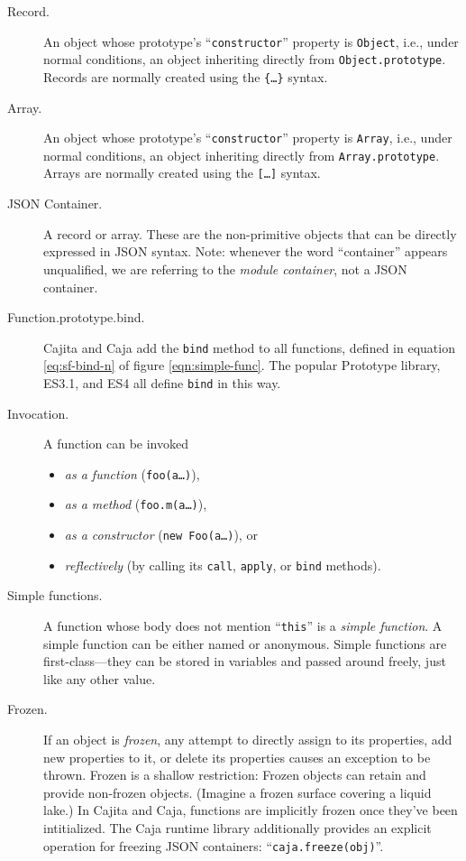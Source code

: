 \documentclass[letterpaper,twocolumn,10pt]{article}
\newcommand{\code}[1]{{\tt {#1}}}              %
\begin{document}
\begin{description}

  \item[Record.] An object whose prototype's ``\code{constructor}'' property is \code{Object}, i.e., under normal 
  conditions, an object inheriting directly from \code{Object.prototype}. Records are normally created using the 
  \code{\{\ldots\}} syntax.

  \item[Array.] An object whose prototype's ``\code{constructor}'' property is \code{Array}, i.e., under normal 
  conditions, an object inheriting directly from \code{Array.prototype}. Arrays are normally created using the 
  \code{[\ldots]} syntax.

  \item[JSON Container.] A record or array. These are the non-primitive objects that can be directly expressed in 
  JSON syntax.  Note: whenever the word ``container'' appears unqualified, we are referring to the \emph{module
  container}, not a JSON container.
  
  \item[Function.prototype.bind.] Cajita and Caja add the \code{bind} method to all functions, defined in equation
  \ref{eq:sf-bind-n} of figure \ref{eqn:simple-func}.  The popular Prototype library, ES3.1, and ES4 all define \code{bind}
  in this way.
  
  \item[Invocation.] A function can be invoked
  \begin{itemize}
    \item \emph{as a function} (\code{foo(a\ldots)}),
    \item \emph{as a method} (\code{foo.m(a\ldots)}),
    \item \emph{as a constructor} (\code{new Foo(a\ldots)}), or
    \item \emph{reflectively} (by calling its \code{call}, \code{apply}, or \code{bind} methods).
  \end{itemize}

  \item[Simple functions.] A function whose body does not mention ``\code{this}'' is a \emph{simple function}. A 
  simple function can be either named or anonymous. Simple functions are first-class---they can be stored in 
  variables and passed around freely, just like any other value.
  
  \item[Frozen.] If an object is \emph{frozen}, any attempt to directly assign to its properties, add new properties 
  to it, or delete its properties causes an exception to be thrown. Frozen is a shallow restriction: Frozen objects 
  can retain and provide non-frozen objects. (Imagine a frozen surface covering a liquid lake.) In Cajita and Caja, functions  
  are implicitly frozen once they've been intitialized. The Caja runtime library additionally provides an explicit 
  operation for freezing JSON containers: ``\code{caja.freeze(obj)}''.
  

\end{description}
\end{document}
